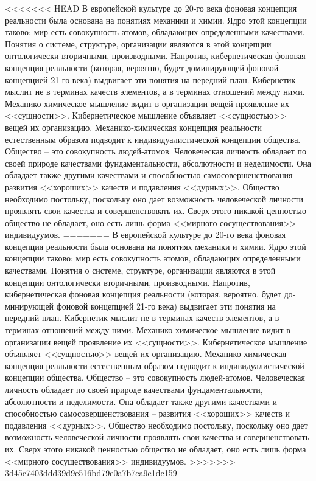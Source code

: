 \documentclass{book}
\begin{document}
<<<<<<< HEAD
В европейской культуре до 20‑го века фоновая концепция реальности была основана на понятиях механики и химии. Ядро этой концепции таково: мир есть совокупность атомов, обладающих определенными качествами.  Понятия о системе, структуре, организации являются в этой концепции онтологически вторичными, производными. Напротив, кибернетическая фоновая концепция реальности (которая, вероятно, будет до­минирующей фоновой концепцией 21‑го века) выдвигает эти понятия на передний план. Кибернетик мыслит не в терминах качеств  элементов, а в терминах отношений между ними. Механико‑химическое мышление видит в организации вещей проявление их <<сущности>>. Кибернетическое мышление объяв­ляет <<сущностью>> вещей их организацию.
Механико‑химическая концепция реальности естественным образом подводит к индивидуалистической концепции общест­ва. Общество -- это совокупность людей‑атомов. Человеческая личность обладает по своей природе качествами фундаменталь­ности, абсолютности и неделимости. Она обладает также дру­гими качествами и способностью самосовершенствования -- развития <<хороших>> качеств и подавления <<дурных>>. Общест­во необходимо постольку, поскольку оно дает возможность человеческой личности проявлять свои качества и совершенст­вовать их. Сверх этого никакой ценностью общество не обла­дает, оно есть лишь форма <<мирного сосуществования>> инди­видуумов.
=======
В европейской культуре до 20-го века фоновая концепция реальности была основана на понятиях механики и химии. Ядро этой концепции таково: мир есть совокупность атомов, обладающих определенными качествами.  Понятия о системе, структуре, организации являются в этой концепции онтологически вторичными, производными. Напротив, кибернетическая фоновая концепция реальности (которая, вероятно, будет до­минирующей фоновой концепцией 21-го века) выдвигает эти понятия на передний план. Кибернетик мыслит не в терминах качеств  элементов, а в терминах отношений между ними. Механико-химическое мышление видит в организации вещей проявление их <<сущности>>. Кибернетическое мышление объяв­ляет <<сущностью>> вещей их организацию.
Механико-химическая концепция реальности естественным образом подводит к индивидуалистической концепции общест­ва. Общество -- это совокупность людей-атомов. Человеческая личность обладает по своей природе качествами фундаменталь­ности, абсолютности и неделимости. Она обладает также дру­гими качествами и способностью самосовершенствования -- развития <<хороших>> качеств и подавления <<дурных>>. Общест­во необходимо постольку, поскольку оно дает возможность человеческой личности проявлять свои качества и совершенст­вовать их. Сверх этого никакой ценностью общество не обла­дает, оно есть лишь форма <<мирного сосуществования>> инди­видуумов.
>>>>>>> 3d45c7403ddd39d9e516bd79e0a7b7ca9e1dc159
\end{document}
